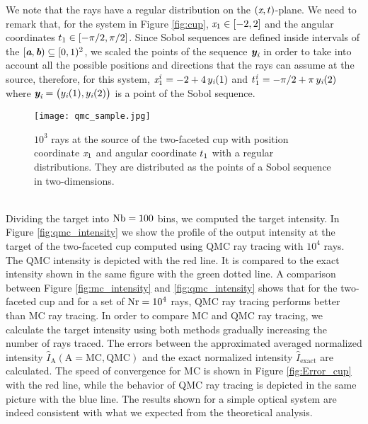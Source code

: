 We note that the rays have a regular distribution on the $(\textit{x}, t)$-plane.
We need to remark that, for the system in Figure \ref{fig:cup}, $\textit{x}_1 \in[-2,2]$ and the angular coordinates $t_1 \in[-\pi/2, \pi/2]$. 
Since Sobol sequences are defined inside intervals of the  $[\textit{\textbf{a}}, \textit{\textbf{b}})\subseteq[0,1)^2$, we scaled the points of the sequence $\textit{\textbf{y}}_{\textit{i}}$ in order to take into account all the possible positions and directions that the rays can assume at the source, therefore, for this system, $\textit{x}_1^{\textit{i}} = -2+4\,y_{\textit{i}}(1)$ and $t_1^{\textit{i}} = -\pi/2+\pi\,y_{\textit{i}}(2)$ where 
$\textit{\textbf{y}}_{\textit{i}} = \big(y_{\textit{i}}(1), y_{\textit{i}}(2)\big)$ is a point of the Sobol sequence. 
\begin{figure}[t]
\begin{center}
    \texttt{[image: qmc\_sample.jpg]}
    \caption{$10^3$ rays at the source of the two-faceted cup with position coordinate $\textit{x}_1$ and angular coordinate $t_1$ with a regular distributions.
They are distributed as the points of a Sobol sequence in two-dimensions.}
    \label{fig:qmc_sample1}
\end{center}
  \end{figure}
\\ \indent Dividing the target into $\textrm{Nb}=100$ bins, we computed the target intensity. 
In Figure \ref{fig:qmc_intensity} we show the profile of the output intensity at the target of the two-faceted cup computed using QMC ray tracing with $10^4$ rays. 
The QMC intensity is depicted with the red line. It is compared to the exact intensity shown in the same figure with the green dotted line.
A comparison between Figure \ref{fig:mc_intensity} and \ref{fig:qmc_intensity} shows that for the two-faceted cup and for a set of $\textrm{Nr}=10^4$ rays, QMC ray tracing performs better than MC ray tracing. In order to compare MC and QMC ray tracing, we calculate the target intensity using both methods gradually increasing the number of rays traced. The errors between the approximated averaged normalized intensity $\hat{I}_{\textrm{A}} (\textrm{A} = \textrm{MC}, \textrm{QMC})$ and the exact normalized intensity $\hat{I}_\textrm{exact}$ are calculated.
The speed of convergence for MC is shown in Figure \ref{fig:Error_cup} with the red line, while the behavior of QMC ray tracing is depicted in the same picture with the blue line.
The results shown for a simple optical system are indeed consistent with what we expected from the theoretical analysis.
